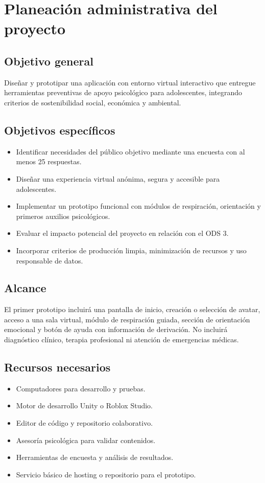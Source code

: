 \documentclass[12pt,letterpaper]{article}
\begin{document}
\section{Planeación administrativa del proyecto}

\subsection{Objetivo general}
Diseñar y prototipar una aplicación con entorno virtual interactivo que entregue herramientas preventivas de apoyo psicológico para adolescentes, integrando criterios de sostenibilidad social, económica y ambiental.

\subsection{Objetivos específicos}
\begin{itemize}[leftmargin=*]
    \item Identificar necesidades del público objetivo mediante una encuesta con al menos 25 respuestas.
    \item Diseñar una experiencia virtual anónima, segura y accesible para adolescentes.
    \item Implementar un prototipo funcional con módulos de respiración, orientación y primeros auxilios psicológicos.
    \item Evaluar el impacto potencial del proyecto en relación con el ODS 3.
    \item Incorporar criterios de producción limpia, minimización de recursos y uso responsable de datos.
\end{itemize}

\subsection{Alcance}
El primer prototipo incluirá una pantalla de inicio, creación o selección de avatar, acceso a una sala virtual, módulo de respiración guiada, sección de orientación emocional y botón de ayuda con información de derivación. No incluirá diagnóstico clínico, terapia profesional ni atención de emergencias médicas.

\subsection{Recursos necesarios}
\begin{itemize}[leftmargin=*]
    \item Computadores para desarrollo y pruebas.
    \item Motor de desarrollo Unity o Roblox Studio.
    \item Editor de código y repositorio colaborativo.
    \item Asesoría psicológica para validar contenidos.
    \item Herramientas de encuesta y análisis de resultados.
    \item Servicio básico de hosting o repositorio para el prototipo.
\end{itemize}
\end{document}
